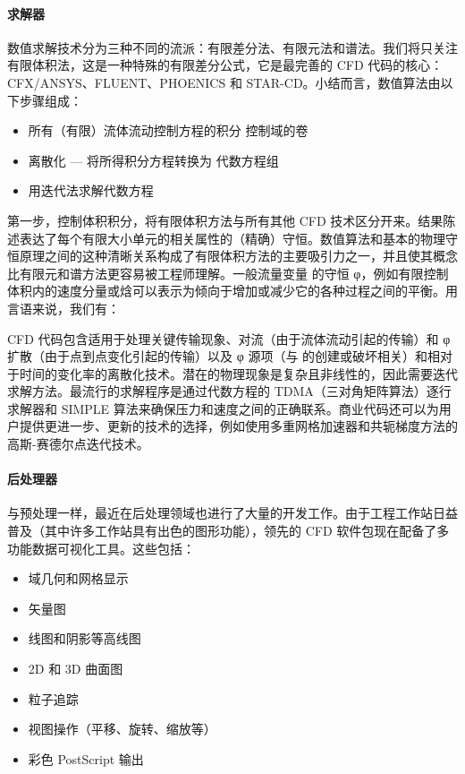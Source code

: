 \documentclass[11pt,a4paper,openany,fontset=none]{ctexbook}
\begin{document}
\paragraph{求解器}

数值求解技术分为三种不同的流派：有限差分法、有限元法和谱法。我们将只关注有限体积法，这是一种特殊的有限差分公式，它是最完善的 CFD 代码的核心：CFX/ANSYS、FLUENT、PHOENICS 和 STAR-CD。小结而言，数值算法由以下步骤组成：

\begin{itemize}

\item 所有（有限）流体流动控制方程的积分 控制域的卷

\item 离散化 — 将所得积分方程转换为 代数方程组

\item 用迭代法求解代数方程

\end{itemize}

第一步，控制体积积分，将有限体积方法与所有其他 CFD 技术区分开来。结果陈述表达了每个有限大小单元的相关属性的（精确）守恒。数值算法和基本的物理守恒原理之间的这种清晰关系构成了有限体积方法的主要吸引力之一，并且使其概念比有限元和谱方法更容易被工程师理解。一般流量变量 的守恒 φ，例如有限控制体积内的速度分量或焓可以表示为倾向于增加或减少它的各种过程之间的平衡。用言语来说，我们有：

CFD 代码包含适用于处理关键传输现象、对流（由于流体流动引起的传输）和 φ 扩散（由于点到点变化引起的传输）以及 φ 源项（与 的创建或破坏相关）和相对于时间的变化率的离散化技术。潜在的物理现象是复杂且非线性的，因此需要迭代求解方法。最流行的求解程序是通过代数方程的 TDMA（三对角矩阵算法）逐行求解器和 SIMPLE 算法来确保压力和速度之间的正确联系。商业代码还可以为用户提供更进一步、更新的技术的选择，例如使用多重网格加速器和共轭梯度方法的高斯-赛德尔点迭代技术。

\paragraph{后处理器}

与预处理一样，最近在后处理领域也进行了大量的开发工作。由于工程工作站日益普及（其中许多工作站具有出色的图形功能），领先的 CFD 软件包现在配备了多功能数据可视化工具。这些包括：

\begin{itemize}

\item 域几何和网格显示

\item 矢量图

\item 线图和阴影等高线图

\item 2D 和 3D 曲面图

\item 粒子追踪

\item 视图操作（平移、旋转、缩放等）

\item 彩色 PostScript 输出

\end{itemize}
\end{document}
